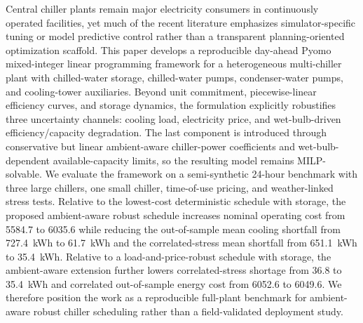 Central chiller plants remain major electricity consumers in continuously operated facilities, yet much of the recent literature emphasizes simulator-specific tuning or model predictive control rather than a transparent planning-oriented optimization scaffold. This paper develops a reproducible day-ahead Pyomo mixed-integer linear programming framework for a heterogeneous multi-chiller plant with chilled-water storage, chilled-water pumps, condenser-water pumps, and cooling-tower auxiliaries. Beyond unit commitment, piecewise-linear efficiency curves, and storage dynamics, the formulation explicitly robustifies three uncertainty channels: cooling load, electricity price, and wet-bulb-driven efficiency/capacity degradation. The last component is introduced through conservative but linear ambient-aware chiller-power coefficients and wet-bulb-dependent available-capacity limits, so the resulting model remains MILP-solvable. We evaluate the framework on a semi-synthetic 24-hour benchmark with three large chillers, one small chiller, time-of-use pricing, and weather-linked stress tests. Relative to the lowest-cost deterministic schedule with storage, the proposed ambient-aware robust schedule increases nominal operating cost from 5584.7 to 6035.6 while reducing the out-of-sample mean cooling shortfall from 727.4~kWh to 61.7~kWh and the correlated-stress mean shortfall from 651.1~kWh to 35.4~kWh. Relative to a load-and-price-robust schedule with storage, the ambient-aware extension further lowers correlated-stress shortage from 36.8 to 35.4~kWh and correlated out-of-sample energy cost from 6052.6 to 6049.6. We therefore position the work as a reproducible full-plant benchmark for ambient-aware robust chiller scheduling rather than a field-validated deployment study.

